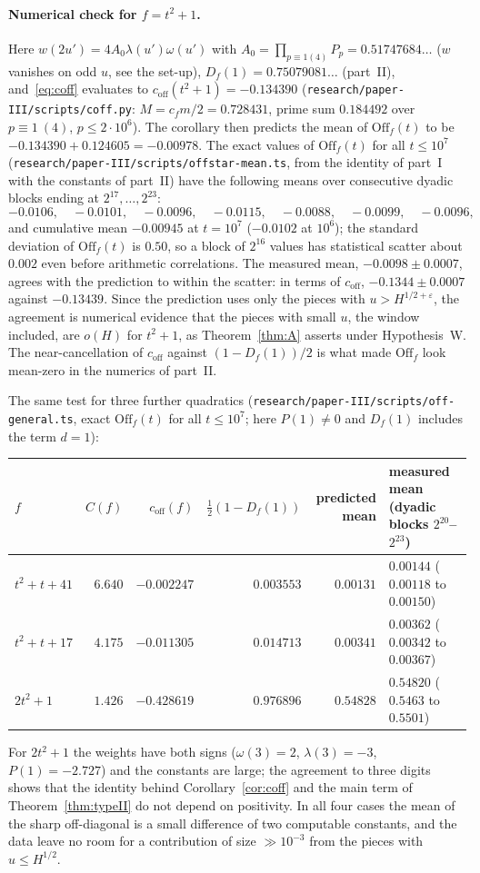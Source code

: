 \documentclass[11pt,a4paper]{article}
\theoremstyle{remark}\newtheorem{remark}[theorem]{Remark}
\newcommand{\Off}{\mathrm{Off}}\newcommand{\e}{\mathrm{e}}
\begin{document}
\paragraph{Numerical check for $f=t^2+1$.} Here $w(2u')=4A_0\lambda(u')\omega(u')$ with $A_0=\prod_{p\equiv1(4)}P_p=0.51747684\ldots$
($w$ vanishes on odd $u$, see the set-up), $D_f(1)=0.75079081\ldots$ (part~II), and~\eqref{eq:coff} evaluates to
$c_{\mathrm{off}}(t^2+1)=-0.134390$ (\texttt{research/paper-III/scripts/coff.py}: $M=c_fm/2=0.728431$, prime sum $0.184492$ over $p\equiv1\ (4)$, $p\le2\cdot10^6$).
The corollary then predicts the mean of $\Off_f(t)$ to be $-0.134390+0.124605=-0.00978$. The exact values of
$\Off_f(t)$ for all $t\le10^7$ (\texttt{research/paper-III/scripts/offstar-mean.ts}, from the identity of part~I with the constants of part~II)
have the following means over consecutive dyadic blocks ending at $2^{17},\dots,2^{23}$:
\[
-0.0106,\quad-0.0101,\quad-0.0096,\quad-0.0115,\quad-0.0088,\quad-0.0099,\quad-0.0096,
\]
and cumulative mean $-0.00945$ at $t=10^7$ ($-0.0102$ at $10^6$); the standard deviation of $\Off_f(t)$ is $0.50$,
so a block of $2^{16}$ values has statistical scatter about $0.002$ even before arithmetic correlations. The
measured mean, $-0.0098\pm0.0007$, agrees with the prediction to within the scatter: in terms of $c_{\mathrm{off}}$,
$-0.1344\pm0.0007$ against $-0.13439$. Since the prediction uses only the pieces with $u>H^{1/2+\varepsilon}$, the
agreement is numerical evidence that the pieces with small $u$, the window included, are $o(H)$ for $t^2+1$,
as Theorem~\ref{thm:A} asserts under Hypothesis~W. The near-cancellation of $c_{\mathrm{off}}$ against
$(1-D_f(1))/2$ is what made $\Off_f$ look mean-zero in the numerics of part~II.

The same test for three further quadratics (\texttt{research/paper-III/scripts/off-general.ts}, exact $\Off_f(t)$ for all
$t\le10^7$; here $P(1)\ne0$ and $D_f(1)$ includes the term $d=1$):
\begin{center}\footnotesize\setlength{\tabcolsep}{4pt}
\begin{tabular}{lrrrrl}
\toprule
$f$ & $C(f)$ & $c_{\mathrm{off}}(f)$ & $\tfrac12(1-D_f(1))$ & predicted mean & measured mean (dyadic blocks $2^{20}$--$2^{23}$)\\
\midrule
$t^2+t+41$ & $6.640$ & $-0.002247$ & $0.003553$ & $0.00131$ & $0.00144$ ($0.00118$ to $0.00150$)\\
$t^2+t+17$ & $4.175$ & $-0.011305$ & $0.014713$ & $0.00341$ & $0.00362$ ($0.00342$ to $0.00367$)\\
$2t^2+1$ & $1.426$ & $-0.428619$ & $0.976896$ & $0.54828$ & $0.54820$ ($0.5463$ to $0.5501$)\\
\bottomrule
\end{tabular}
\end{center}
For $2t^2+1$ the weights have both signs ($\omega(3)=2$, $\lambda(3)=-3$, $P(1)=-2.727$) and the constants are large; the
agreement to three digits shows that the identity behind Corollary~\ref{cor:coff} and the main term of
Theorem~\ref{thm:typeII} do not depend on positivity. In all four cases the mean of the sharp off-diagonal is a
small difference of two computable constants, and the data leave no room for a contribution of size $\gg10^{-3}$
from the pieces with $u\le H^{1/2}$.
\end{document}
